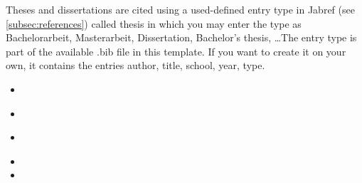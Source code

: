 Theses and dissertations are cited using a used-defined entry type in Jabref (see \autoref{subsec:references}) called thesis in which you may enter the type as Bachelorarbeit, Masterarbeit, Dissertation, Bachelor's thesis, \dots The entry type is part of the available .bib file in this template. If you want to create it on your own, it contains the entries author, title, school, year, type.
\begin{itemize}
\item {}
\end{itemize}
\begin{itemize}
\item {}
\end{itemize}
\begin{itemize}
\item {}
\end{itemize}
\begin{itemize}
\item {}
\item {}
\end{itemize}